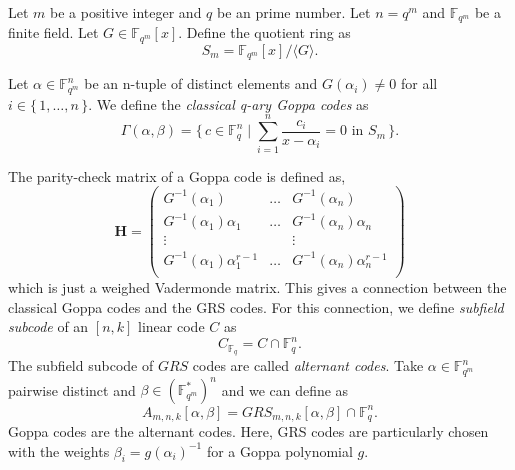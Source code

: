 Let $m$ be a positive integer and $q$ be an prime number. Let $n = q^m$ and $\mathbb{F}_{q^m}$ be a finite field. Let $G \in \mathbb{F}_{q^m}[x]$. Define the quotient ring as
\[
S_m = \mathbb{F}_{q^m}[x] / \langle G \rangle.
\]

\begin{definition}
Let $\alpha \in \mathbb{F}_{q^m}^n$ be an n-tuple of distinct elements and $G(\alpha_i) \neq 0$ for all $i \in \{\,1, \dots, n \,\}$. We define the \textit{classical q-ary Goppa codes} as
\[
\Gamma(\alpha, \beta) = 
\{\,c \in \mathbb{F}_q^n \mid \sum_{i = 1}^n \frac{c_i}{x - \alpha_i} = 0 \text{ in } S_m \,\}.
\]
\end{definition}

The parity-check matrix of a Goppa code is defined as,
\[
\mathbf{H}=\begin{pmatrix}
    G^{-1}(\alpha_1)&\dots&G^{-1}(\alpha_n)\\
    G^{-1}(\alpha_1)\alpha_1&\dots&G^{-1}(\alpha_n)\alpha_n\\
    \vdots&&\vdots\\
    G^{-1}(\alpha_1)\alpha_1^{r-1}&\dots&G^{-1}(\alpha_n)\alpha_n^{r-1}\\
\end{pmatrix}
\]
which is just a weighed Vadermonde matrix. This gives a connection between the classical Goppa codes and the GRS codes. 
For this connection, we define \textit{subfield subcode} of an $[n,k]$ linear code $C$ as 
\[
C_{\mathbb{F}_q} = C \cap\mathbb{F}_q^n.
\]
The subfield subcode of $GRS$ codes are called \textit{alternant codes}. Take $\alpha\in \mathbb{F}_{q^m}^n$ pairwise distinct and $\beta\in(\mathbb{F}_{q^m}^\ast)^n$ and we can define as
\[
A_{m,n,k}[\alpha,\beta]=GRS_{m,n,k}[\alpha,\beta]\cap\mathbb{F}_q^n.
\]
Goppa codes are the alternant codes. Here, GRS codes are particularly chosen with the weights $\beta_i = g(\alpha_i)^{-1}$ for a Goppa polynomial $g$.\\[0.2cm] 

